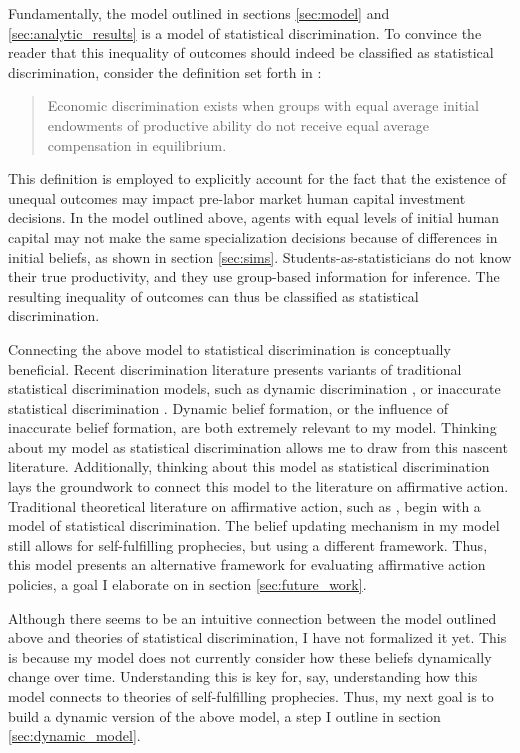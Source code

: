 Fundamentally, the model outlined in sections \ref{sec:model} and \ref{sec:analytic_results} is a model of statistical discrimination. 
To convince the reader that this inequality of outcomes should indeed be classified as statistical discrimination, consider the definition set forth in \textcite{LS83}:
\begin{quote}
Economic discrimination exists when groups with equal average initial endowments of productive ability do not receive equal average compensation in equilibrium.
\end{quote}
This definition is employed to explicitly account for the fact that the existence of unequal outcomes may impact pre-labor market human capital investment decisions. 
In the model outlined above, agents with equal levels of initial human capital may not make the same specialization decisions because of differences in initial beliefs, as shown in section \ref{sec:sims}.
Students-as-statisticians do not know their true productivity, and they use group-based information for inference. 
The resulting inequality of outcomes can thus be classified as statistical discrimination. 

Connecting the above model to statistical discrimination is conceptually beneficial.
Recent discrimination literature presents variants of traditional statistical discrimination models, such as dynamic discrimination \parencite{BIR19}, or inaccurate statistical discrimination \parencite{BHIP19-wp}. 
Dynamic belief formation, or the influence of inaccurate belief formation, are both extremely relevant to my model.
Thinking about my model as statistical discrimination allows me to draw from this nascent literature. 
Additionally, thinking about this model as statistical discrimination lays the groundwork to connect this model to the literature on affirmative action. 
Traditional theoretical literature on affirmative action, such as \textcite{CL93}, begin with a model of statistical discrimination.
The belief updating mechanism in my model still allows for self-fulfilling prophecies, but using a different framework.
Thus, this model presents an alternative framework for evaluating affirmative action policies, a goal I elaborate on in section \ref{sec:future_work}.



Although there seems to be an intuitive connection between the model outlined 
above and theories of statistical discrimination, I have not formalized it yet.
This is because my model does not currently consider how these beliefs dynamically change over time. 
Understanding this is key for, say, understanding how this model connects to theories of self-fulfilling prophecies.
Thus, my next goal is to build a dynamic version of the above model, a step I outline in section \ref{sec:dynamic_model}.